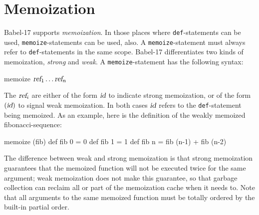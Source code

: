 \documentclass[11pt]{amsart}
\newcommand{\metababel}[1] {\textsl{#1}}
\newcommand{\babelsrc}[1] {\lstinline!#1!}
\begin{document}
\section{Memoization}
Babel-17 supports \emph{memoization}. 
In those places where \babelsrc{def}-statements can be used, \babelsrc{memoize}-statements can be used, also. A \babelsrc{memoize}-statement must always refer to \babelsrc{def}-statements in the same scope. Babel-17 differentiates two kinds of memoization, \emph{strong} and \emph{weak}. A \babelsrc{memoize}-statement has the following syntax:
\begin{babellisting}
memoize $\metababel{ref}_1 \hdots \metababel{ref}_n$
\end{babellisting}
The $\metababel{ref}_i$ are either of the form $\metababel{id}$ to indicate strong memoization, or of the form $(\metababel{id})$ to signal weak memoization. In both cases $\metababel{id}$ refers to the \babelsrc{def}-statement being memoized. As an example, here is the definition of the weakly memoized fibonacci-sequence:
\begin{babellisting}
memoize (fib)
def fib 0 = 0
def fib 1 = 1
def fib n = fib (n-1) + fib (n-2)
\end{babellisting}
The difference between weak and strong memoization is that strong memoization guarantees that the memoized function will not be executed twice for the same argument; weak memoization does not make this guarantee, so that garbage collection can reclaim all or part of the memoization cache when it needs to. Note that all arguments to the same memoized function must be totally ordered by the built-in partial order.
\end{document}
